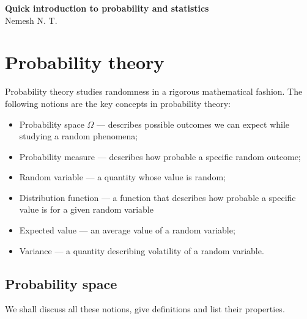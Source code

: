 \documentclass[12pt]{article}
\begin{document}
\begin{center}

    \Large \textbf{Quick introduction to probability and statistics}\\[0.5cm]
    \small {Nemesh N. T.}\\[0.5cm]

\end{center}

\section{Probability theory}

Probability theory studies randomness in a rigorous mathematical fashion. The
following notions are the key concepts in probability theory:
\begin{itemize}
    \item Probability space $\Omega$ --- describes possible outcomes we can
          expect while studying a random phenomena;
    \item Probability measure --- describes how probable a specific 
          random outcome;
    \item Random variable --- a quantity whose value is random;
    \item Distribution function --- a function that describes how probable a
          specific value is for a given random variable
    \item Expected value --- an average value of a random variable;
    \item Variance --- a quantity describing volatility of a random variable.
\end{itemize}



\subsection{Probability space}

We shall discuss all these notions, give definitions and list their properties.
\end{document}
